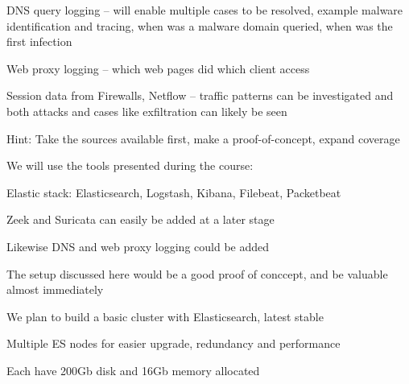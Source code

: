 \documentclass[Screen16to9,17pt]{foils}
\begin{document}
\begin{list2}
\item DNS query logging -- will enable multiple cases to be resolved, example malware identification and tracing, when was a malware domain queried, when was the first infection
\item Web proxy logging -- which web pages did which client access
\item Session data from Firewalls, Netflow -- traffic patterns can be investigated and both attacks and cases like exfiltration can likely be seen

\end{list2}

Hint: Take the sources available first, make a proof-of-concept, expand coverage







\begin{quote}

\end{quote}

We will use the tools presented during the course:
\begin{list2}
\item Elastic stack: Elasticsearch, Logstash, Kibana, Filebeat, Packetbeat
\item Zeek and Suricata can easily be added at a later stage
\item Likewise DNS and web proxy logging could be added
\end{list2}

\vskip 1cm

The setup discussed here would be a good proof of conccept, and be valuable almost immediately




\begin{list2}
\item We plan to build a basic cluster with Elasticsearch, latest stable
\item Multiple ES nodes for easier upgrade, redundancy and performance
\item Each have 200Gb disk and 16Gb memory allocated
\end{list2}




\end{document}
